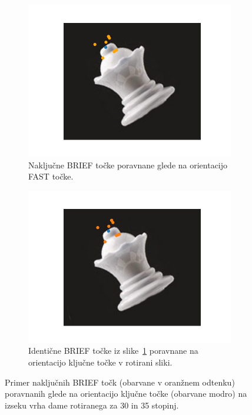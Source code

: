 \documentclass[a4paper,11pt]{article}
\begin{document}
\begin{figure}[h!b]
	\centering
	\begin{subfigure}[t]{0.48\textwidth}
		\centering
		\includegraphics[width=\textwidth]{images/brief_orientation_0.png}
		\caption{Naključne BRIEF točke poravnane glede na orientacijo FAST točke.}
		\label{img:brief_orientation_0}
	\end{subfigure}
	\hfill
	\begin{subfigure}[t]{0.48\textwidth}
		\centering
		\includegraphics[width=\textwidth]{images/brief_orientation_1.png}
		\caption{Identične BRIEF točke iz slike~\ref{img:brief_orientation_0} poravnane na orientacijo ključne točke v rotirani sliki.}
		\label{img:brief_orientation_1}
	\end{subfigure}
	\caption{Primer naključnih BRIEF točk (obarvane v oranžnem odtenku) poravnanih glede na orientacijo ključne točke (obarvane modro) na izseku vrha dame rotiranega za 30 in 35 stopinj.}
	\label{img:brief_orientation}
\end{figure}
\end{document}

